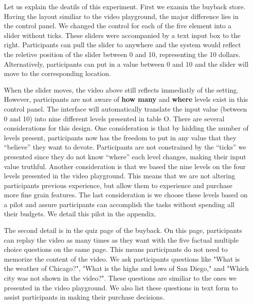 Let us explain the deatils of this experiment. First we examin the buyback store. Having the layout similiar to the video playground, the major difference lies in the control panel. We changed the control for each of the five element into a slider without ticks. These sliders were accompanied by a text input box to the right. Participants can pull the slider to anywhere and the system would reflect the reletive position of the slider between 0 and 10, representing the 10 dollars. Alternatively, participants can put in a value between 0 and 10 and the slider will move to the corresponding location.

When the slider moves, the video above still reflects immediatly of the setting.
However, participants are not aware of \textbf{how many} and \textbf{where} levels exist in this control panel. The interface will automatically translate the input value (between 0 and 10) into nine different levels presented in table O. 
There are several considerations for this design. 
One consideration is that by hidding the number of levels present, participants now has the freedom to put in any value that they ``believe'' they want to devote. Participants are not constrained by the ``ticks'' we presented since they do not know ``where'' each level changes, making their input value truthful. Another consideration is that we based the nine levels on the four levels presented in the video playground. This means that we are not altering participants previous experience, but allow them to experience and purchase more fine grain features. The last consideration is we choose these levels based on a pilot and assure participants can accomplish the tasks without spending all their budgets. We detail this pilot in the appendix.

The second detail is in the quiz page of the buyback. On this page, participants can replay the video as many times as they want with the five factual multiple choice questions on the same page. This means participants do not need to memorize the content of the video. We ask participants questions like "What is the weather of Chicago?", "What is the highs and lows of San Diego," and "Which city was not shown in the video?". These questions are similiar to the ones we presented in the video playground. We also list these questions in text form to assist participants in making their purchase decisions. 

